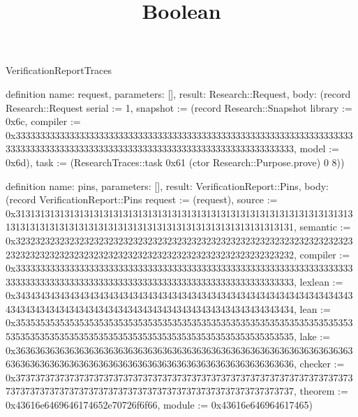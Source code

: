 \begin{lexlean}{VerificationReportTraces}
\title{Boolean}
\begin{semanticmodule}

definition{
  name: request,
  parameters: [],
  result: Research::Request,
  body: (record Research::Request {serial := 1, snapshot := (record Research::Snapshot {library := 0x6c, compiler := 0x33333333333333333333333333333333333333333333333333333333333333333333333333333333333333333333333333333333333333333333333333333333, model := 0x6d}), task := (ResearchTraces::task 0x61 (ctor Research::Purpose.prove) 0 8)})
}

definition{
  name: pins,
  parameters: [],
  result: VerificationReport::Pins,
  body: (record VerificationReport::Pins {request := (request), source := 0x31313131313131313131313131313131313131313131313131313131313131313131313131313131313131313131313131313131313131313131313131313131, semantic := 0x32323232323232323232323232323232323232323232323232323232323232323232323232323232323232323232323232323232323232323232323232323232, compiler := 0x33333333333333333333333333333333333333333333333333333333333333333333333333333333333333333333333333333333333333333333333333333333, lexlean := 0x34343434343434343434343434343434343434343434343434343434343434343434343434343434343434343434343434343434343434343434343434343434, lean := 0x35353535353535353535353535353535353535353535353535353535353535353535353535353535353535353535353535353535353535353535353535353535, lake := 0x36363636363636363636363636363636363636363636363636363636363636363636363636363636363636363636363636363636363636363636363636363636, checker := 0x37373737373737373737373737373737373737373737373737373737373737373737373737373737373737373737373737373737373737373737373737373737, theorem := 0x43616e6469646174652e70726f6f66, module := 0x43616e646964617465})
}


\end{semanticmodule}
\end{lexlean}
